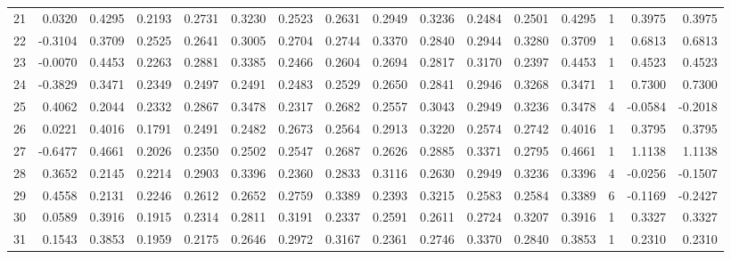 \begin{tabular}{lrrrrrrrrrrrrrrr}
21  &      0.0320 &  0.4295 &  0.2193 &  0.2731 &  0.3230 &  0.2523 &  0.2631 &  0.2949 &  0.3236 &  0.2484 &   0.2501 &     0.4295 &      1 &                    0.3975 &                     0.3975 \\
22  &     -0.3104 &  0.3709 &  0.2525 &  0.2641 &  0.3005 &  0.2704 &  0.2744 &  0.3370 &  0.2840 &  0.2944 &   0.3280 &     0.3709 &      1 &                    0.6813 &                     0.6813 \\
23  &     -0.0070 &  0.4453 &  0.2263 &  0.2881 &  0.3385 &  0.2466 &  0.2604 &  0.2694 &  0.2817 &  0.3170 &   0.2397 &     0.4453 &      1 &                    0.4523 &                     0.4523 \\
24  &     -0.3829 &  0.3471 &  0.2349 &  0.2497 &  0.2491 &  0.2483 &  0.2529 &  0.2650 &  0.2841 &  0.2946 &   0.3268 &     0.3471 &      1 &                    0.7300 &                     0.7300 \\
25  &      0.4062 &  0.2044 &  0.2332 &  0.2867 &  0.3478 &  0.2317 &  0.2682 &  0.2557 &  0.3043 &  0.2949 &   0.3236 &     0.3478 &      4 &                   -0.0584 &                    -0.2018 \\
26  &      0.0221 &  0.4016 &  0.1791 &  0.2491 &  0.2482 &  0.2673 &  0.2564 &  0.2913 &  0.3220 &  0.2574 &   0.2742 &     0.4016 &      1 &                    0.3795 &                     0.3795 \\
27  &     -0.6477 &  0.4661 &  0.2026 &  0.2350 &  0.2502 &  0.2547 &  0.2687 &  0.2626 &  0.2885 &  0.3371 &   0.2795 &     0.4661 &      1 &                    1.1138 &                     1.1138 \\
28  &      0.3652 &  0.2145 &  0.2214 &  0.2903 &  0.3396 &  0.2360 &  0.2833 &  0.3116 &  0.2630 &  0.2949 &   0.3236 &     0.3396 &      4 &                   -0.0256 &                    -0.1507 \\
29  &      0.4558 &  0.2131 &  0.2246 &  0.2612 &  0.2652 &  0.2759 &  0.3389 &  0.2393 &  0.3215 &  0.2583 &   0.2584 &     0.3389 &      6 &                   -0.1169 &                    -0.2427 \\
30  &      0.0589 &  0.3916 &  0.1915 &  0.2314 &  0.2811 &  0.3191 &  0.2337 &  0.2591 &  0.2611 &  0.2724 &   0.3207 &     0.3916 &      1 &                    0.3327 &                     0.3327 \\
31  &      0.1543 &  0.3853 &  0.1959 &  0.2175 &  0.2646 &  0.2972 &  0.3167 &  0.2361 &  0.2746 &  0.3370 &   0.2840 &     0.3853 &      1 &                    0.2310 &                     0.2310 \\

\end{tabular}
